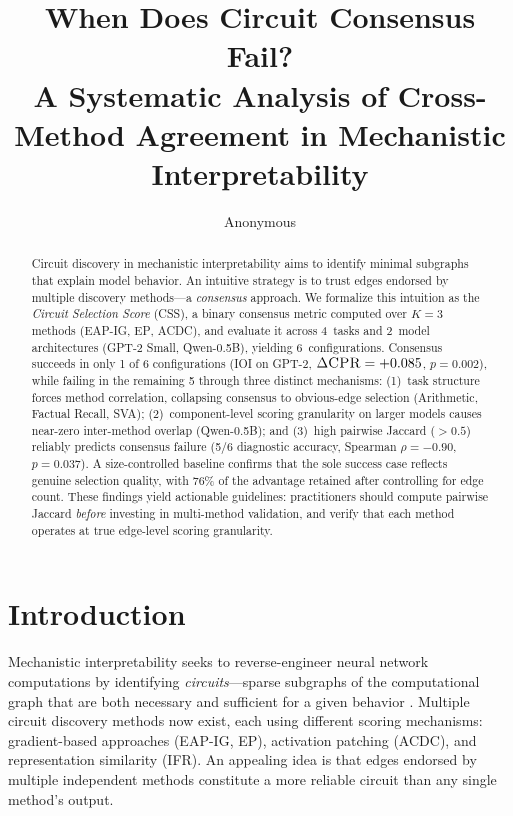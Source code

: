 \documentclass[11pt,a4paper]{article}
\title{When Does Circuit Consensus Fail? \\ A Systematic Analysis of Cross-Method Agreement in Mechanistic Interpretability}
\author{Anonymous}
\newcommand{\css}{\textsc{CSS}}
\newcommand{\cpr}{\textsc{CPR}}
\newcommand{\eapig}{\textsc{EAP-IG}}
\newcommand{\acdc}{\textsc{ACDC}}
\newcommand{\ep}{\textsc{EP}}
\newcommand{\ifr}{\textsc{IFR}}
\begin{document}
\maketitle

\begin{abstract}
Circuit discovery in mechanistic interpretability aims to identify minimal subgraphs that explain model behavior. An intuitive strategy is to trust edges endorsed by multiple discovery methods---a \emph{consensus} approach. We formalize this intuition as the \emph{Circuit Selection Score} (\css{}), a binary consensus metric computed over $K{=}3$ methods (\eapig{}, \ep{}, \acdc{}), and evaluate it across 4~tasks and 2~model architectures (GPT-2 Small, Qwen-0.5B), yielding 6~configurations. Consensus succeeds in only 1 of 6 configurations (IOI on GPT-2, $\Delta\cpr{}=+0.085$, $p{=}0.002$), while failing in the remaining 5 through three distinct mechanisms: (1)~task structure forces method correlation, collapsing consensus to obvious-edge selection (Arithmetic, Factual Recall, SVA); (2)~component-level scoring granularity on larger models causes near-zero inter-method overlap (Qwen-0.5B); and (3)~high pairwise Jaccard ($>0.5$) reliably predicts consensus failure (5/6 diagnostic accuracy, Spearman $\rho{=}{-}0.90$, $p{=}0.037$). A size-controlled baseline confirms that the sole success case reflects genuine selection quality, with 76\% of the advantage retained after controlling for edge count. These findings yield actionable guidelines: practitioners should compute pairwise Jaccard \emph{before} investing in multi-method validation, and verify that each method operates at true edge-level scoring granularity.
\end{abstract}

\section{Introduction}
\label{sec:intro}

Mechanistic interpretability seeks to reverse-engineer neural network computations by identifying \emph{circuits}---sparse subgraphs of the computational graph that are both necessary and sufficient for a given behavior \cite{elhage2021mathematical, conmy2023towards, wang2023interpretability}. Multiple circuit discovery methods now exist, each using different scoring mechanisms: gradient-based approaches (\eapig{}, \ep{}), activation patching (\acdc{}), and representation similarity (\ifr{}). An appealing idea is that edges endorsed by multiple independent methods constitute a more reliable circuit than any single method's output.
\end{document}
